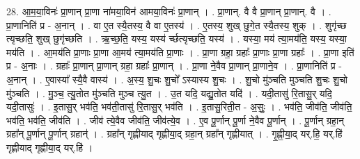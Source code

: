 \documentclass[17pt]{extarticle}
\begin{document}
28. आ॒म॒या॒विनः॑ प्रा॒णान् प्रा॒णा ना॑मया॒विन॑ आमया॒विनः॑ प्रा॒णान् । . प्रा॒णान्. वै वै प्रा॒णान् प्रा॒णान्. वै । . प्रा॒णानिति॑ प्र - अ॒नान् । . वा ए॒त स्यै॒तस्य॒ वै वा ए॒तस्य॑ । . ए॒तस्य॒ शुख् छुगे॒त स्यै॒तस्य॒ शुक् । . शुगृ॑च्छ त्यृच्छति॒ शुख् छुगृ॑च्छति । . ऋ॒च्छ॒ति॒ यस्य॒ यस्य॑ र्च्छत्यृच्छति॒ यस्य॑ । . यस्या॒ मय॑ त्या॒मय॑ति॒ यस्य॒ यस्या॒ मय॑ति । . आ॒मय॑ति प्रा॒णाः प्रा॒णा आ॒मय॑ त्या॒मय॑ति प्रा॒णाः । . प्रा॒णा ग्रहा॒ ग्रहाः᳚ प्रा॒णाः प्रा॒णा ग्रहाः᳚ । . प्रा॒णा इति॑ प्र - अ॒नाः । . ग्रहाः᳚ प्रा॒णान् प्रा॒णान् ग्रहा॒ ग्रहाः᳚ प्रा॒णान् । . प्रा॒णा ने॒वैव प्रा॒णान् प्रा॒णाने॒व । . प्रा॒णानिति॑ प्र - अ॒नान् । . ए॒वास्या᳚ स्यै॒वै वास्य॑ । . अ॒स्य॒ शु॒चः शु॒चो᳚ ऽस्यास्य शु॒चः । . शु॒चो मु॑ञ्चति मुञ्चति शु॒चः शु॒चो मु॑ञ्चति । . मु॒ञ्च॒ त्यु॒तोत मु॑ञ्चति मुञ्च त्यु॒त । . उ॒त यदि॒ यद्यु॒तोत यदि॑ । . यदी॒तासु॑ रि॒तासु॒र् यदि॒ यदी॒तासुः॑ । . इ॒तासु॒र् भव॑ति॒ भव॑ती॒तासु॑ रि॒तासु॒र् भव॑ति । . इ॒तासु॒रिती॒त - अ॒सुः॒ । . भव॑ति॒ जीव॑ति॒ जीव॑ति॒ भव॑ति॒ भव॑ति॒ जीव॑ति । . जीव॑ त्ये॒वैव जीव॑ति॒ जीव॑त्ये॒व । . ए॒व पू॒र्णान् पू॒र्णा ने॒वैव पू॒र्णान् । . पू॒र्णान् ग्रहा॒न् ग्रहा᳚न् पू॒र्णान् पू॒र्णान् ग्रहान्॑ । . ग्रहा᳚न् गृह्णीयाद् गृह्णीया॒द् ग्रहा॒न् ग्रहा᳚न् गृह्णीयात् । . गृ॒ह्णी॒या॒द् यर्.हि॒ यर्.हि॑ गृह्णीयाद् गृह्णीया॒द् यर्.हि॑ । \newline
\end{document}
